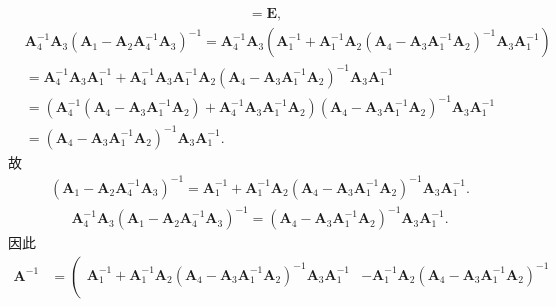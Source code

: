 \documentclass[../../main.tex]{subfiles}
\begin{document}
\begin{solution}
\begin{align*}
&=\boldsymbol{E},
\end{align*}
\begin{align*}
&\boldsymbol{A}_{4}^{-1}\boldsymbol{A}_3(\boldsymbol{A}_1-\boldsymbol{A}_2\boldsymbol{A}_{4}^{-1}\boldsymbol{A}_3)^{-1}=\boldsymbol{A}_{4}^{-1}\boldsymbol{A}_3\left( \boldsymbol{A}_{1}^{-1}+\boldsymbol{A}_{1}^{-1}\boldsymbol{A}_2\left( \boldsymbol{A}_4-\boldsymbol{A}_3\boldsymbol{A}_{1}^{-1}\boldsymbol{A}_2 \right) ^{-1}\boldsymbol{A}_3\boldsymbol{A}_{1}^{-1} \right) 
\\
&=\boldsymbol{A}_{4}^{-1}\boldsymbol{A}_3\boldsymbol{A}_{1}^{-1}+\boldsymbol{A}_{4}^{-1}\boldsymbol{A}_3\boldsymbol{A}_{1}^{-1}\boldsymbol{A}_2\left( \boldsymbol{A}_4-\boldsymbol{A}_3\boldsymbol{A}_{1}^{-1}\boldsymbol{A}_2 \right) ^{-1}\boldsymbol{A}_3\boldsymbol{A}_{1}^{-1}
\\
&=\left( \boldsymbol{A}_{4}^{-1}\left( \boldsymbol{A}_4-\boldsymbol{A}_3\boldsymbol{A}_{1}^{-1}\boldsymbol{A}_2 \right) +\boldsymbol{A}_{4}^{-1}\boldsymbol{A}_3\boldsymbol{A}_{1}^{-1}\boldsymbol{A}_2 \right) \left( \boldsymbol{A}_4-\boldsymbol{A}_3\boldsymbol{A}_{1}^{-1}\boldsymbol{A}_2 \right) ^{-1}\boldsymbol{A}_3\boldsymbol{A}_{1}^{-1}
\\
&=\left( \boldsymbol{A}_4-\boldsymbol{A}_3\boldsymbol{A}_{1}^{-1}\boldsymbol{A}_2 \right) ^{-1}\boldsymbol{A}_3\boldsymbol{A}_{1}^{-1}.
\end{align*}
故
\begin{align*}
\left( \boldsymbol{A}_1-\boldsymbol{A}_2\boldsymbol{A}_{4}^{-1}\boldsymbol{A}_3 \right) ^{-1}=\boldsymbol{A}_{1}^{-1}+\boldsymbol{A}_{1}^{-1}\boldsymbol{A}_2\left( \boldsymbol{A}_4-\boldsymbol{A}_3\boldsymbol{A}_{1}^{-1}\boldsymbol{A}_2 \right) ^{-1}\boldsymbol{A}_3\boldsymbol{A}_{1}^{-1}.
\end{align*}
\begin{align*}
\boldsymbol{A}_{4}^{-1}\boldsymbol{A}_3(\boldsymbol{A}_1-\boldsymbol{A}_2\boldsymbol{A}_{4}^{-1}\boldsymbol{A}_3)^{-1}=\left( \boldsymbol{A}_4-\boldsymbol{A}_3\boldsymbol{A}_{1}^{-1}\boldsymbol{A}_2 \right) ^{-1}\boldsymbol{A}_3\boldsymbol{A}_{1}^{-1}.
\end{align*}
因此
\begin{align*}
\boldsymbol{A}^{-1}&=\left( \begin{matrix}
\boldsymbol{A}_{1}^{-1}+\boldsymbol{A}_{1}^{-1}\boldsymbol{A}_2\left( \boldsymbol{A}_4-\boldsymbol{A}_3\boldsymbol{A}_{1}^{-1}\boldsymbol{A}_2 \right) ^{-1}\boldsymbol{A}_3\boldsymbol{A}_{1}^{-1}&		-\boldsymbol{A}_{1}^{-1}\boldsymbol{A}_2\left( \boldsymbol{A}_4-\boldsymbol{A}_3\boldsymbol{A}_{1}^{-1}\boldsymbol{A}_2 \right) ^{-1}\\

\end{matrix}
\end{align*}
\end{solution}
\end{document}
